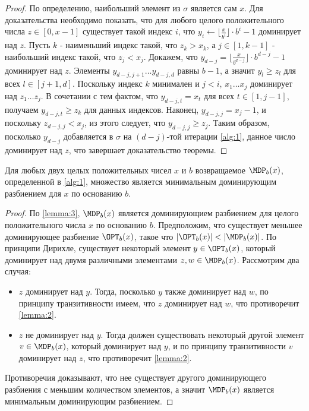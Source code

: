 \begin{proof}
	По определению, наибольший элемент из $\sigma$ является сам $x$.
	Для доказательства необходимо показать, что для любого целого положительного числа $z \in [0, x - 1]$ существует такой индекс $i$, что $y_i \leftarrow \lfloor \frac{x}{b^i} \rfloor \cdot b^i - 1$ доминирует над $z$.
	Пусть $k$ - наименьший индекс такой, что $z_k > x_k$, а $j \in [1, k - 1]$ - наибольший индекс такой, что $z_j < x_j$.
	Докажем, что $y_{d - j} = \lfloor \frac{x}{b^{d - j}} \rfloor \cdot b^{d - j} - 1$ доминирует над $z$.
	Элементы $y_{d - j, j + 1} \dots y_{d - j, d}$ равны $b - 1$, а значит $y_l \geq z_l$ для всех $l \in [j + 1, d]$.
	Поскольку индекс $k$ минимален и $j < i$, $x_1 \dots x_j$ доминирует над $z_1 \dots z_j$.
	В сочетании с тем фактом, что $y_{d - j, t} = x_t$ для всех $t \in [1, j - 1]$, получаем $y_{d - j, t} \geq z_k$ для данных индексов.
	Наконец, $y_{d - j, j} = x_j - 1$, и поскольку $z_{d - j, j} < x_j$, из этого следует, что $y_{d - j, j} \geq z_j$.
	Таким образом, посколько $y_{d - j}$ добавляется в $\sigma$ на $(d - j)$-той итерации \ref{alg:1}, данное число доминирует над $z$, что завершает доказательство теоремы.
\end{proof}

\begin{theorem}
	\label{theorem:1}
	Для любых двух целых положительных чисел $x$ и $b$ возвращаемое $\MDP_b(x)$, определенной в \ref{alg:1}, множество является минимальным доминирующим разбиением для $x$ по основанию $b$.
\end{theorem}

\begin{proof}
	 По \ref{lemma:3}, $\MDP_b(x)$ является доминирующием разбиением для целого положительного числа $x$ по основанию $b$.
	Предположим, что существует меньшее доминирующее разбиение $\OPT_b(x)$, такое что $|\OPT_b(x)| < |\MDP_b(x)|$.
	По принципи Дирихле, существует некоторый элемент $y \in \OPT_b(x)$, который доминирует над двумя различными элементами $z, w \in \MDP_b(x)$.
	Рассмотрим два случая:
	\begin{itemize}
		\item $z$ доминирует над $y$. Тогда, посколько $y$ также доминирует над $w$, по принципу транзитивности имеем, что $z$ доминирует над $w$, что противоречит \ref{lemma:2}.
		\item $z$ не доминирует над $y$. Тогда должен существовать некоторый другой элемент $v \in \MDP_b(x)$, который доминирует над $y$, и по принципу транзитивности $v$ доминирует над $z$, что противоречит \ref{lemma:2}.
	\end{itemize}
	Противоречия доказывают, что нее существует другого доминирующего разбиения с меньшим количеством элементов, а значит $\MDP_b(x)$ является минимальным доминирующим разбиением.
\end{proof}

